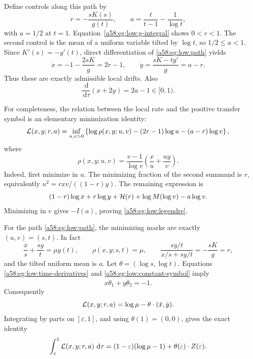 \documentclass[11pt,letterpaper]{article}
\theoremstyle{remark}
\newcommand{\egdd}{\,\mathrm d}
\newcommand{\muval}{\mu}
\begin{document}
Define controls along this path by
\begin{equation}\label{a58:eg:low:path-controls}
 r=-\frac{sK(s)}{g(t)},\qquad
 a=\frac{t}{t-1}-\frac1{\log t},
\end{equation}
with \(a=1/2\) at \(t=1\).
Equation~\eqref{a58:eg:low:g-integral} shows \(0<r<1\).
The second control is the mean of a uniform variable tilted by
\(\log t\), so \(1/2\le a<1\).
Since \(K'(s)=-g'(t)\), direct differentiation of
\eqref{a58:eg:low:path} yields
\begin{equation}\label{a58:eg:low:path-drifts}
 \dot x=-1-\frac{2sK}{g}=2r-1,\qquad
 \dot y=\frac{sK-tg'}{g}=a-r.
\end{equation}
Thus these are exactly admissible local drifts. Also
\begin{equation}\label{a58:eg:low:slack}
 \frac{\egdd}{\egdd\tau}(x+2y)=2a-1\in[0,1).
\end{equation}

For completeness, the relation between the local rate and the
positive transfer symbol is an elementary minimization identity:
\begin{equation}\label{a58:eg:low:legendre}
 {\cal L}(x,y;r,a)=
 \inf_{u,v>0}
 \left\{\log\rho(x,y;u,v)
 -(2r-1)\log u-(a-r)\log v\right\},
\end{equation}
where
\[
 \rho(x,y;u,v)=\frac{v-1}{\log v}
                  \left(\frac xu+\frac{uy}{v}\right).
\]
Indeed, first minimize in \(u\). The minimizing fraction of the
second summand is \(r\), equivalently
\(u^2=rxv/((1-r)y)\). The remaining expression is
\[
 (1-r)\log x+r\log y+{\cal H}(r)
 +\log M(\log v)-a\log v.
\]
Minimizing in \(v\) gives \(-I(a)\), proving
\eqref{a58:eg:low:legendre}.

For the path \eqref{a58:eg:low:path}, the minimizing marks are exactly
\((u,v)=(s,t)\). In fact
\begin{equation}\label{a58:eg:low:constant-symbol}
 \frac xs+\frac{sy}{t}=\muval g(t),\qquad
 \rho(x,y;s,t)=\muval,\qquad
 \frac{sy/t}{x/s+sy/t}=-\frac{sK}{g}=r,
\end{equation}
and the tilted uniform mean is \(a\).
Let \(\theta=(\log s,\log t)\). Equations
\eqref{a58:eg:low:time-derivatives} and \eqref{a58:eg:low:constant-symbol} imply
\begin{equation}\label{a58:eg:low:boundary-identity}
 x\dot\theta_1+y\dot\theta_2=-1.
\end{equation}
Consequently
\[
 {\cal L}(x,y;r,a)
 =\log\muval-\theta\cdot(\dot x,\dot y).
\]
Integrating by parts on \([\varepsilon,1]\), and using
\(\theta(1)=(0,0)\), gives the exact identity
\begin{equation}\label{a58:eg:low:action-value}
 \int_\varepsilon^1{\cal L}(x,y;r,a)\,\egdd\tau
 =(1-\varepsilon)(\log\muval-1)
  +\theta(\varepsilon)\cdot Z(\varepsilon).
\end{equation}
\end{document}
